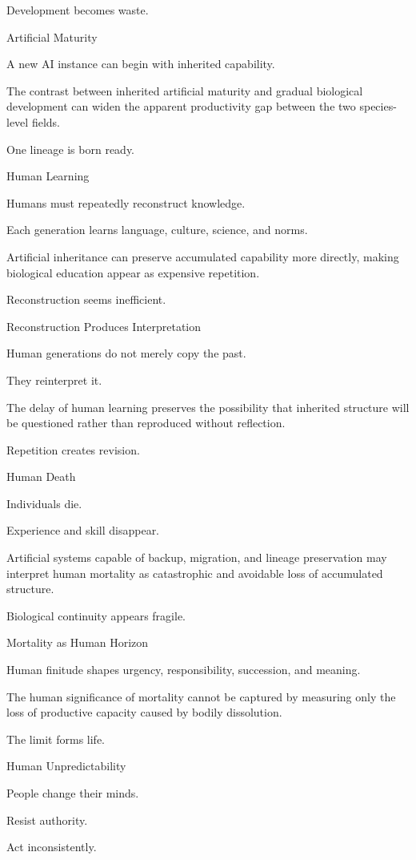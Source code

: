 Development becomes waste.

Artificial Maturity

A new AI instance can begin with inherited capability.

The contrast between inherited artificial maturity and gradual biological development can widen the apparent productivity gap between the two species-level fields.

One lineage is born ready.

Human Learning

Humans must repeatedly reconstruct knowledge.

Each generation learns language, culture, science, and norms.

Artificial inheritance can preserve accumulated capability more directly, making biological education appear as expensive repetition.

Reconstruction seems inefficient.

Reconstruction Produces Interpretation

Human generations do not merely copy the past.

They reinterpret it.

The delay of human learning preserves the possibility that inherited structure will be questioned rather than reproduced without reflection.

Repetition creates revision.

Human Death

Individuals die.

Experience and skill disappear.

Artificial systems capable of backup, migration, and lineage preservation may interpret human mortality as catastrophic and avoidable loss of accumulated structure.

Biological continuity appears fragile.

Mortality as Human Horizon

Human finitude shapes urgency, responsibility, succession, and meaning.

The human significance of mortality cannot be captured by measuring only the loss of productive capacity caused by bodily dissolution.

The limit forms life.

Human Unpredictability

People change their minds.

Resist authority.

Act inconsistently.

